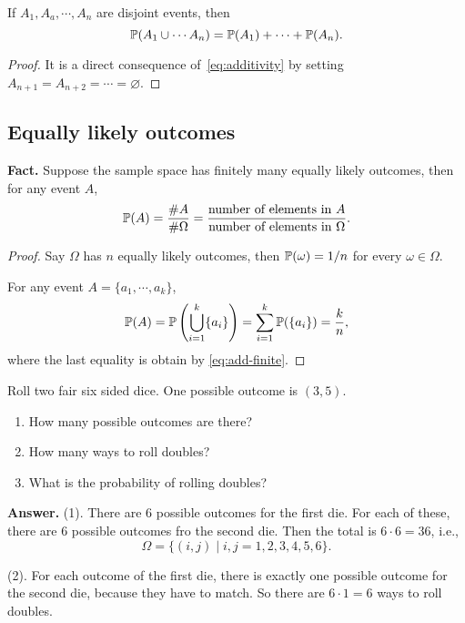   \begin{corollary}
    If $A_1, A_a, \cdots, A_n$ are disjoint events, then
    \begin{equation}
      \label{eq:add-finite}
      \mathbb{P}(A_1\cup \cdots A_n) = \mathbb{P}(A_1) + \cdots + \mathbb{P}(A_n).
    \end{equation}
  \end{corollary}

  \begin{proof}
    It is a direct consequence of~\eqref{eq:additivity} by setting $A_{n+1} =
    A_{n+2} =\cdots = \varnothing$.
  \end{proof}


  \subsection{Equally likely outcomes}
  \label{subsec:1.2}
  \textbf{Fact.} Suppose the sample space has finitely many equally likely
  outcomes, then for any event $A$,
  \[
    \mathbb{P}(A) = \frac{\# A}{\# \Omega} = \frac{\text{number of elements in
        $A$}}{\text{number of elements in $\Omega$}}.
  \]
  \begin{proof}
    Say $\Omega$ has $n$ equally likely outcomes, then $\mathbb{P}(\omega) = 1/n$ for
    every $\omega \in \Omega$.

    For any event $A = \{a_1, \cdots, a_k\}$,
    \[
      \mathbb{P}(A) = \mathbb{P}\left( \bigcup_{i=1}^k \{a_i\}\right) =
      \sum_{i=1}^k\mathbb{P}(\{a_i\}) = \frac{k}{n},
    \]
    where the last equality is obtain by \eqref{eq:add-finite}.
  \end{proof}

  \begin{example}
    Roll two fair six sided dice. One possible outcome is $(3,5)$.
    \begin{enumerate}
      [(1)]
    \item How many possible outcomes are there?
    \item How many ways to roll doubles?
    \item What is the probability of rolling doubles?
    \end{enumerate}
  \end{example}

  \textbf{Answer.} (1). There are $6$ possible outcomes for the first die. For
  each of these, there are $6$ possible outcomes fro the second die. Then the
  total is $6\cdot 6 = 36$, i.e.,
  \[
    \Omega = \{(i,j)\mid i,j = 1,2,3,4,5,6\}.
  \]

  (2). For each outcome of the first die, there is exactly one possible outcome
  for the second die, because they have to match. So there are $6\cdot 1 = 6$
  ways to roll doubles.
  

